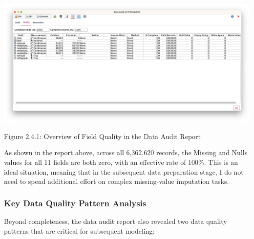 \documentclass[sigplan,screen]{acmart}
\begin{document}
\begin{center}
\includegraphics[width=0.9\columnwidth]{2.4.1.png}
\vspace{0.2cm}

Figure 2.4.1: Overview of Field Quality in the Data Audit Report
\end{center}

\vspace{0.3cm}

As shown in the report above, across all 6,362,620 records, the Missing and Nulls values for all 11 fields are both zero, with an effective rate of 100\%. This is an ideal situation, meaning that in the subsequent data preparation stage, I do not need to spend additional effort on complex missing-value imputation tasks.

\subsubsection{Key Data Quality Pattern Analysis}

Beyond completeness, the data audit report also revealed two data quality patterns that are critical for subsequent modeling:
\end{document}
